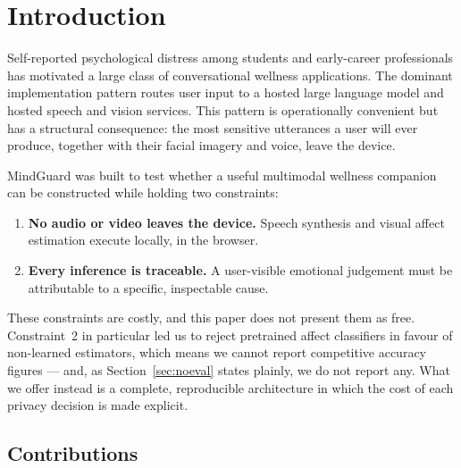 \documentclass[conference]{IEEEtran}
\begin{document}
\section{Introduction}
\label{sec:intro}

Self-reported psychological distress among students and early-career
professionals has motivated a large class of conversational wellness
applications. The dominant implementation pattern routes user input to a
hosted large language model and hosted speech and vision services. This
pattern is operationally convenient but has a structural consequence: the
most sensitive utterances a user will ever produce, together with their
facial imagery and voice, leave the device.

MindGuard was built to test whether a useful multimodal wellness companion
can be constructed while holding two constraints:

\begin{enumerate}
\item \textbf{No audio or video leaves the device.} Speech synthesis and
visual affect estimation execute locally, in the browser.
\item \textbf{Every inference is traceable.} A user-visible emotional
judgement must be attributable to a specific, inspectable cause.
\end{enumerate}

These constraints are costly, and this paper does not present them as free.
Constraint~2 in particular led us to reject pretrained affect classifiers in
favour of non-learned estimators, which means we cannot report competitive
accuracy figures --- and, as Section~\ref{sec:noeval} states plainly, we do not
report any. What we offer instead is a complete, reproducible architecture in
which the cost of each privacy decision is made explicit.

\subsection{Contributions}
\end{document}
